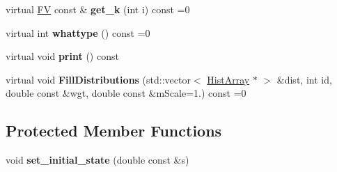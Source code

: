 \begin{DoxyCompactItemize}
\item 
\hypertarget{classPS__2_aa23e50a0b5d3ac32fb63afb4f67d3910}{virtual \hyperlink{classFV}{F\-V} const \& {\bfseries get\-\_\-k} (int i) const =0}\label{classPS__2_aa23e50a0b5d3ac32fb63afb4f67d3910}

\item 
\hypertarget{classPS__2_ac3bb7468d7b1e1b62018f13a1121e86a}{virtual int {\bfseries whattype} () const =0}\label{classPS__2_ac3bb7468d7b1e1b62018f13a1121e86a}

\item 
\hypertarget{classPS__2_a395f9455cfdebcfd145ba679c43ac2c5}{virtual void {\bfseries print} () const }\label{classPS__2_a395f9455cfdebcfd145ba679c43ac2c5}

\item 
\hypertarget{classPS__2_a66a9dc1e77a262f05f8b917003259c31}{virtual void {\bfseries Fill\-Distributions} (std\-::vector$<$ \hyperlink{classHistArray}{Hist\-Array} $\ast$ $>$ \&dist, int id, double const \&wgt, double const \&m\-Scale=1.) const =0}\label{classPS__2_a66a9dc1e77a262f05f8b917003259c31}

\end{DoxyCompactItemize}
\subsection*{Protected Member Functions}
\begin{DoxyCompactItemize}
\item 
\hypertarget{classPS__2_a6d49cef4b1eb1138b947c9ec9b448538}{void {\bfseries set\-\_\-initial\-\_\-state} (double const \&s)}\label{classPS__2_a6d49cef4b1eb1138b947c9ec9b448538}

\end{DoxyCompactItemize}
